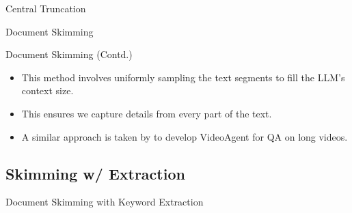 \begin{frame}{Central Truncation}
\begin{frame}{Document Skimming}
	\only<1>{
		\vskip 3.4cm
	}


\end{frame}

\begin{frame}{Document Skimming (Contd.)}

	\begin{itemize}
		\item This method involves uniformly sampling the text segments to fill the LLM's
		context size.
		\item<3-> This ensures we capture details from every part of the text.
		\item<4> A similar approach is taken by \citet{wang2024videoagent} to develop
		VideoAgent for QA on long videos.
	\end{itemize}



\end{frame}


\subsection{Skimming w/ Extraction}

\begin{frame}{Document Skimming with Keyword Extraction}


\end{frame}
\end{frame}
